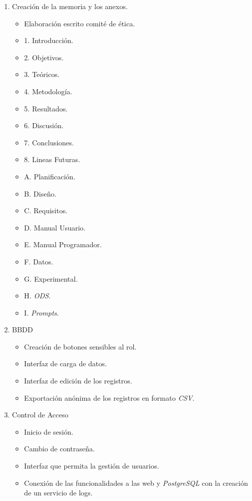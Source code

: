 \begin{enumerate}
\begin{itemize}
		\item Posicionamiento de las imágenes.
		\item Ordenación de los elementos gráficos.
	\end{itemize}
	\item Creación de la memoria y los anexos.
	\begin{itemize}
		\item Elaboración escrito comité de ética.
		\item 1. Introducción.
		\item 2. Objetivos.
		\item 3. Teóricos.
		\item 4. Metodología.
		\item 5. Resultados.
		\item 6. Discusión.
		\item 7. Conclusiones.
		\item 8. Lineas Futuras.
		
		\item A. Planificación.
		\item B. Diseño.
		\item C. Requisitos.
		\item D. Manual Usuario.
		\item E. Manual Programador.
		\item F. Datos.
		\item G. Experimental.
		\item H. \textit{ODS}.
		\item I. \textit{Prompts}.
	\end{itemize}
	\item BBDD
	\begin{itemize}
		\item Creación de botones sensibles al rol.
		\item Interfaz de carga de datos.
		\item Interfaz de edición de los registros.
		\item Exportación anónima de los registros en formato \textit{CSV}.
	\end{itemize}
	\item Control de Acceso
	\begin{itemize}
		\item Inicio de sesión.
		\item Cambio de contraseña.
		\item Interfaz que permita la gestión de usuarios.
		\item Conexión de las funcionalidades a las web y \textit{PostgreSQL} con la creación de un servicio de logs. 
	\end{itemize}
\end{enumerate}

